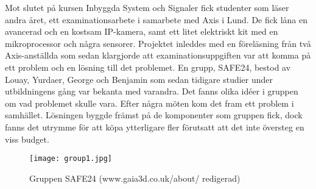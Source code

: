 



\begin{abstracts}        %

Mot slutet på kursen Inbyggda System och Signaler fick studenter som läser andra året, ett examinationsarbete i samarbete med Axis i Lund. De fick låna en avancerad och en kostsam IP-kamera, samt ett litet elektriskt kit med en mikroprocessor och några sensorer. Projektet inleddes med en föreläsning från två Axis-anställda som sedan klargjorde att examinationsuppgiften var att komma på ett problem och en lösning till det problemet. En grupp, SAFE24, bestod av Louay, Yurdaer, George och Benjamin som sedan tidigare studier under utbildningens gång var bekanta med varandra. Det fanns olika idéer i gruppen om vad problemet skulle vara. Efter några möten kom det fram ett problem i samhället. Lösningen byggde främst på de komponenter som gruppen fick, dock fanns det utrymme för att köpa ytterligare fler förutsatt att det inte översteg en viss budget.



\begin{figure}[h]
  \texttt{[image: group1.jpg]}
  \caption{Gruppen SAFE24 (www.gaia3d.co.uk/about/ redigerad)}
  \label{fig:group1}
\end{figure}


\end{abstracts}


